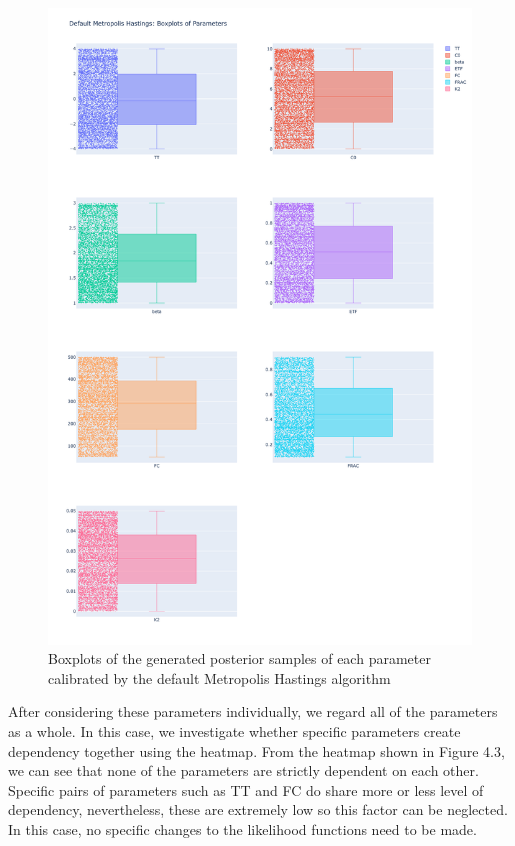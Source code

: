\begin{figure}
    \centering
    \includegraphics[width=1\textwidth]{figures/basic_mh/default_mh/default_mh_boxplot.png}
    \captionsetup{width=.8\textwidth}
    \caption{Boxplots of the generated posterior samples of each parameter calibrated by the default Metropolis Hastings algorithm}
    \label{fig:enter-label}
\end{figure}



After considering these parameters individually, we regard all of the parameters as a whole. In this case, we investigate whether specific parameters create dependency together using the heatmap. From the heatmap shown in Figure 4.3, we can see that none of the parameters are strictly dependent on each other. Specific pairs of parameters such as TT and FC do share more or less level of dependency, nevertheless, these are extremely low so this factor can be neglected. In this case, no specific changes to the likelihood functions need to be made.


